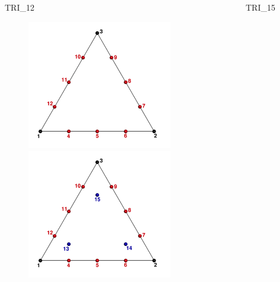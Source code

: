 {{{\bigskip
\bigskip
\newpage
{}

TRI\_12~~~~~~~~~~~~~~~~~~~~~~~~~~~~~~~~~~~~~~~~~~~~~~~~~~~TRI\_15
\begin{figure}[!htb]
   \includegraphics[width=2.5in]{conv.figs/TecplotFiles_Quartic_Element/All_Figures/Tri_12}
   \includegraphics[width=2.5in]{conv.figs/TecplotFiles_Quartic_Element/All_Figures/Tri_15}
\end{figure}

\vspace{1.5\baselineskip}

}}}
